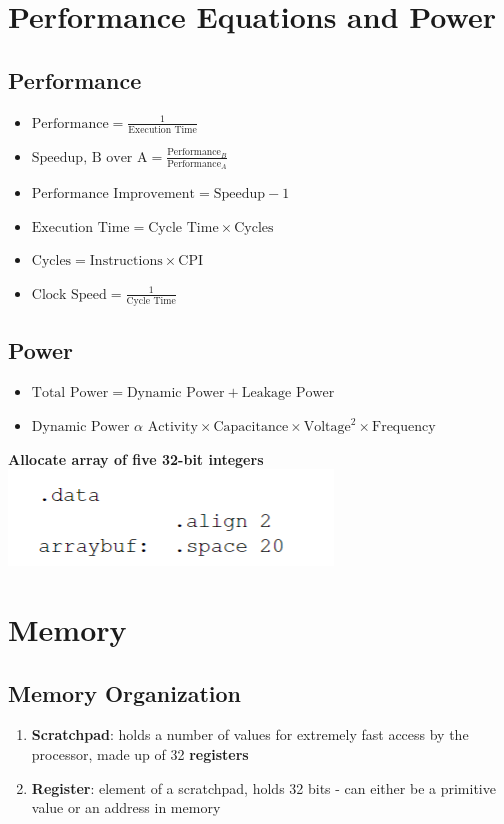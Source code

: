 \documentclass{article}
\begin{document}
\section{Performance Equations and Power}
\subsection{Performance}
\begin{multicols}{2}
    \begin{itemize}
        \item $\text{Performance} = \frac{1}{\text{Execution Time}}$
        \item $\text{Speedup, B over A} = \frac{\text{Performance}_B}{\text{Performance}_A}$
        \item $\text{Performance Improvement} = \text{Speedup} - 1$
    \end{itemize}
\columnbreak
    \begin{itemize}
        \item $\text{Execution Time} = \text{Cycle Time} \times \text{Cycles}$
        \item $\text{Cycles} = \text{Instructions} \times \text{CPI}$
        \item $\text{Clock Speed} = \frac{1}{\text{Cycle Time}}$
    \end{itemize}
\end{multicols}
\subsection{Power}
\begin{itemize}
    \item $\text{Total Power} = \text{Dynamic Power} + \text{Leakage Power}$
    \item $\text{Dynamic Power } \alpha \text{ Activity} \times \text{Capacitance} \times \text{Voltage}^2 \times \text{Frequency}$
\end{itemize}
\textbf{Allocate array of five 32-bit integers}
\includegraphics[width=0.30\linewidth]{allocate_array.png}
\section{Memory}
\subsection{Memory Organization}
\begin{enumerate}
    \item \textbf{Scratchpad}: holds a number of values for extremely fast access by the processor, made up of 32 \textbf{registers}
    \item \textbf{Register}: element of a scratchpad, holds 32 bits - can either be a primitive value or an address in memory
\end{enumerate}
\end{document}
